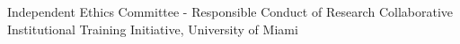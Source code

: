 %
%
%



\begin{scholarship}
				{Independent Ethics Committee - Responsible Conduct of Research}
				{Collaborative Institutional Training Initiative, University of Miami}
\end{scholarship}